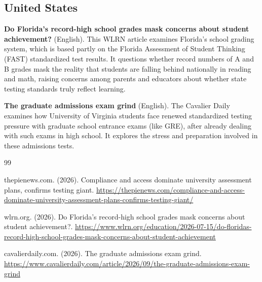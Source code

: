 \documentclass[11pt]{article}
\begin{document}
\subsection{United States}

\textbf{Do Florida's record-high school grades mask concerns about student achievement?} \citep{wlrnorg2026n1} (English). This WLRN article examines Florida's school grading system, which is based partly on the Florida Assessment of Student Thinking (FAST) standardized test results. It questions whether record numbers of A and B grades mask the reality that students are falling behind nationally in reading and math, raising concerns among parents and educators about whether state testing standards truly reflect learning.

\textbf{The graduate admissions exam grind} \citep{cavalierdailycom2026n2} (English). The Cavalier Daily examines how University of Virginia students face renewed standardized testing pressure with graduate school entrance exams (like GRE), after already dealing with such exams in high school. It explores the stress and preparation involved in these admissions tests.


\begin{thebibliography}{99}

thepienews.com. (2026). Compliance and access dominate university assessment plans, confirms testing giant. \url{https://thepienews.com/compliance-and-access-dominate-university-assessment-plans-confirms-testing-giant/}

wlrn.org. (2026). Do Florida's record-high school grades mask concerns about student achievement?. \url{https://www.wlrn.org/education/2026-07-15/do-floridas-record-high-school-grades-mask-concerns-about-student-achievement}

cavalierdaily.com. (2026). The graduate admissions exam grind. \url{https://www.cavalierdaily.com/article/2026/09/the-graduate-admissions-exam-grind}

\end{thebibliography}
\end{document}
